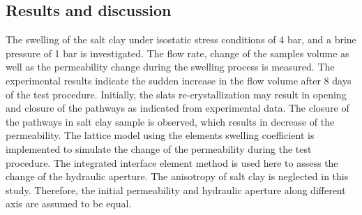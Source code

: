 
\subsection{Results and discussion}

The swelling of the salt clay under isostatic stress conditions of 4 bar, and a brine pressure of 1 bar is investigated. The flow rate, change of the samples volume as well as the permeability change during the swelling process is measured. The experimental results indicate the sudden increase in the flow volume after 8 days of the test procedure. Initially, the slats re-crystallization may result in opening and closure of the pathways as indicated from experimental data. The closure of the pathways in salt clay sample is observed, which results in decrease of the permeability. The lattice model using the elements swelling coefficient is implemented to simulate the change of the permeability during the test procedure. The integrated interface element method is used here to assess the change of the hydraulic aperture. The anisotropy of salt clay is neglected in this study. Therefore, the initial permeability and hydraulic aperture along different axis are assumed to be equal. 